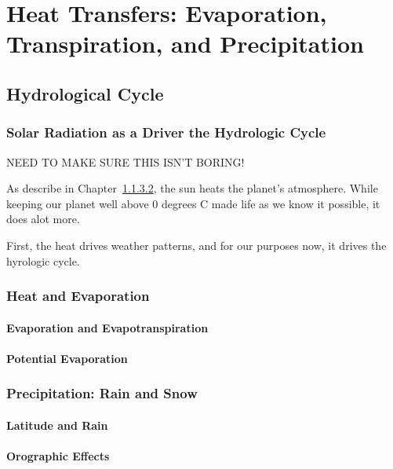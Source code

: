 \chapter{Heat Transfers: Evaporation, Transpiration, and Precipitation}\label{ch:evapotranspiration}

\section{Hydrological Cycle}

\subsection{Solar Radiation as a Driver the Hydrologic Cycle}

NEED TO MAKE SURE THIS ISN'T BORING!

As describe in Chapter~\ref{}, the sun heats the planet's atmosphere. While keeping our planet well above 0 degrees C made life as we know it possible, it does alot more. 

First, the heat drives weather patterns, and for our purposes now, it drives the hyrologic cycle.  

\subsection{Heat and Evaporation}

\subsubsection{Evaporation and Evapotranspiration}

\subsubsection{Potential Evaporation}

\subsection{Precipitation: Rain and Snow}

\subsubsection{Latitude and Rain}

\subsubsection{Orographic Effects}

